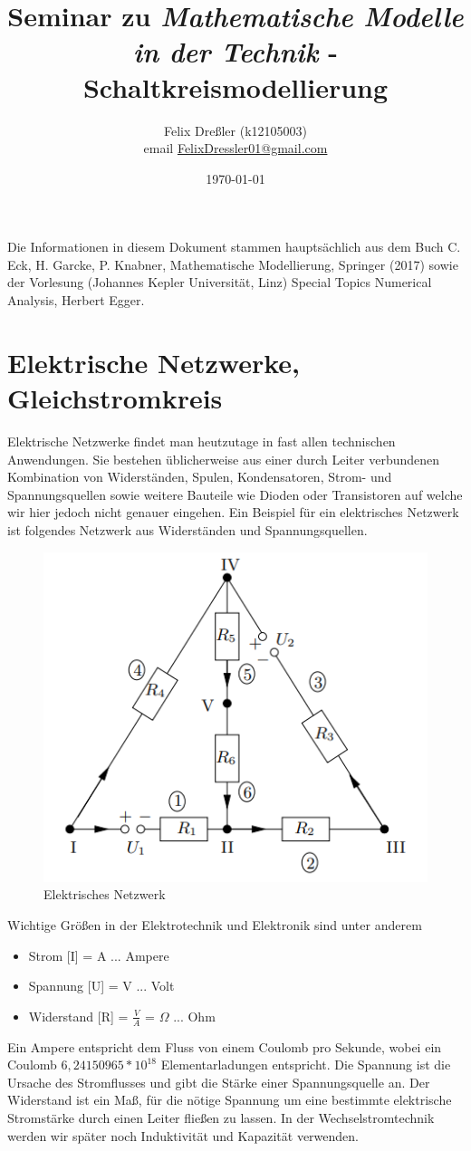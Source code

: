 \documentclass[11pt,titlepage]{article}
\title{Seminar zu \textit{Mathematische Modelle in der Technik} - Schaltkreismodellierung}
\author{Felix Dreßler (k12105003)\\ email \href{mailto:FelixDressler01@gmail.com}{FelixDressler01@gmail.com}}
\date{\today} %
\begin{document}
\maketitle

	\tiny{Die Informationen in diesem Dokument stammen hauptsächlich aus dem Buch C. Eck, H. Garcke, P. Knabner, Mathematische Modellierung, Springer (2017) sowie der Vorlesung (Johannes Kepler Universität, Linz) Special Topics Numerical Analysis, Herbert Egger.}
	
	\normalsize

	\section{Elektrische Netzwerke, Gleichstromkreis}
		Elektrische Netzwerke findet man heutzutage in fast allen technischen Anwendungen. Sie bestehen üblicherweise aus einer durch Leiter verbundenen Kombination von Widerständen, Spulen, Kondensatoren, Strom- und Spannungsquellen sowie weitere Bauteile wie Dioden oder Transistoren auf welche wir hier jedoch nicht genauer eingehen. Ein Beispiel für ein elektrisches Netzwerk ist folgendes Netzwerk aus Widerständen und Spannungsquellen.
		\begin{figure}[ht]
			\centering
			\includegraphics[scale=0.7]{Photos/ElektrNEt.png}
			\caption{Elektrisches Netzwerk}
		\end{figure}
	
		Wichtige Größen in der Elektrotechnik und Elektronik sind unter anderem
		\begin{itemize}
			\item Strom [I] = A ... Ampere
			\item Spannung [U] = V ... Volt
			\item Widerstand [R] = $\frac{V}{A}$ = $\Omega$ ... Ohm
		\end{itemize}
		Ein Ampere entspricht dem Fluss von einem Coulomb pro Sekunde, wobei ein Coulomb $6,24150965 * 10^{18}$ Elementarladungen entspricht. Die Spannung ist die Ursache des Stromflusses und gibt die \glqq Stärke\grqq{} einer Spannungsquelle an. Der Widerstand ist ein Maß, für die nötige Spannung um eine bestimmte elektrische Stromstärke durch einen Leiter fließen zu lassen.
		In der Wechselstromtechnik werden wir später noch Induktivität und Kapazität verwenden.
\end{document}
